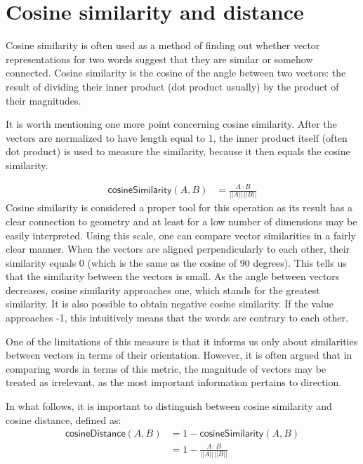 \documentclass[
  12pt,
]{book}
\begin{document}
\hypertarget{cosine-similarity-and-distance}{%
\section{Cosine similarity and distance}\label{cosine-similarity-and-distance}}

Cosine similarity is often used as a method of finding out whether vector representations for two words suggest that they are similar or somehow connected. Cosine similarity is the cosine of the angle between two vectors: the result of dividing their inner product (dot product usually) by the product of their magnitudes.

It is worth mentioning one more point concerning cosine similarity. After the vectors are normalized to have length equal to 1, the inner product itself (often dot product) is used to measure the similarity, because it then equals the cosine similarity.

\begin{align} \tag{Sim}
\mathsf{cosineSimilarity}(A,B) & = \frac{A \cdot B}{\vert \vert A \vert \vert \,\vert \vert B \vert \vert}
\end{align}
Cosine similarity is considered a proper tool for this operation as its result has a clear connection to geometry and at least for a low number of dimensions may be easily interpreted. Using this scale, one can compare vector similarities in a fairly clear manner. When the vectors are aligned perpendicularly to each other, their similarity equals 0 (which is the same as the cosine of 90 degrees). This tells us that the similarity between the vectors is small. As the angle between vectors decreases, cosine similarity approaches one, which stands for the greatest similarity. It is also possible to obtain negative cosine similarity. If the value approaches -1, this intuitively means that the words are contrary to each other.

One of the limitations of this measure is that it informs us only about similarities between vectors in terms of their orientation. However, it is often argued that in comparing words in terms of this metric, the magnitude of vectors may be treated as irrelevant, as the most important information pertains to direction.

In what follows, it is important to distinguish between cosine similarity and cosine distance, defined as:
\begin{align} \tag{Sim}
\mathsf{cosineDistance}(A,B) &  = 1 - \mathsf{cosineSimilarity}(A,B)\\
 &  = 1 - \frac{A \cdot B}{\vert \vert A \vert \vert \,\vert \vert B \vert \vert} \nonumber
\end{align}
\end{document}
